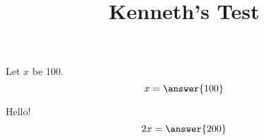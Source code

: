 \documentclass{ximera}
\title{Kenneth's Test}
\begin{document}
\maketitle
\begin{exercise}
Let $x$ be 100.
\[ x = \answer{100}\]
\begin{exercise}
    Hello!
\[ 2x = \answer{200}\]
\end{exercise}
\end{exercise}
\end{document}
